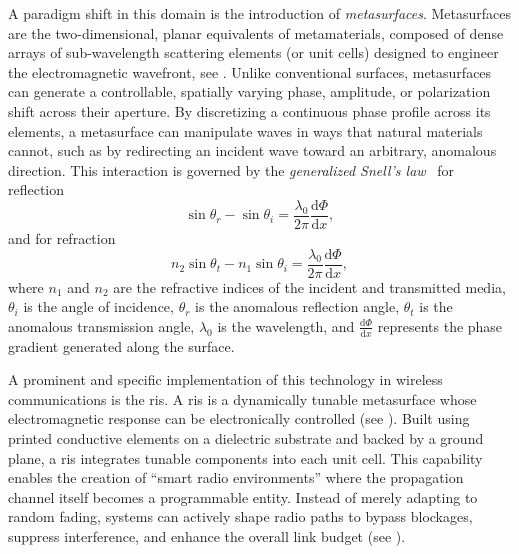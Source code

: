 A paradigm shift in this domain is the introduction of \emph{metasurfaces}. Metasurfaces are the two-dimensional, planar equivalents of metamaterials, composed of dense arrays of sub-\gls{wavelength} scattering elements (or unit cells) designed to engineer the electromagnetic wavefront, see . Unlike conventional surfaces, metasurfaces can generate a controllable, spatially varying phase, amplitude, or polarization shift across their aperture. By discretizing a continuous phase profile across its elements, a metasurface can manipulate waves in ways that natural materials cannot, such as by redirecting an incident wave toward an arbitrary, anomalous direction. This interaction is governed by the \emph{generalized Snell's law}~ for reflection
\begin{equation}\label{eq:generalized-snell-reflection}
  \sin \theta_r - \sin \theta_i = \frac{\lambda _0}{2\pi} \frac{\mathrm{d}\Phi}{\mathrm{d}x},
\end{equation}
and for refraction
\begin{equation}\label{eq:generalized-snell-refraction}
  n_2 \sin \theta_t - n_1 \sin \theta_i = \frac{\lambda_0}{2\pi} \frac{\mathrm{d}\Phi}{\mathrm{d}x},
\end{equation}
where $n_1$ and $n_2$ are the refractive indices of the incident and transmitted media, $\theta_i$ is the angle of incidence, $\theta_r$ is the anomalous reflection angle, $\theta_t$ is the anomalous transmission angle, $\lambda_0$ is the  \gls{wavelength}, and $\tfrac{\mathrm{d}\Phi}{\mathrm{d}x}$ represents the phase gradient generated along the surface.

\begin{marginfigure}
  \centering
  \caption{A , inspired by~\cite[Fig.~1]{An2025}.}
\end{marginfigure}

A prominent and specific implementation of this technology in wireless communications is the \gls{ris}. A \gls{ris} is a dynamically tunable metasurface whose electromagnetic response can be electronically controlled (see ). Built using printed conductive elements on a dielectric substrate and backed by a ground plane, a \gls{ris} integrates tunable components into each unit cell. This capability enables the creation of \enquote{smart radio environments} where the propagation channel itself becomes a programmable entity. Instead of merely adapting to random fading, systems can actively shape radio paths to bypass blockages, suppress interference, and enhance the overall link budget (see ).

